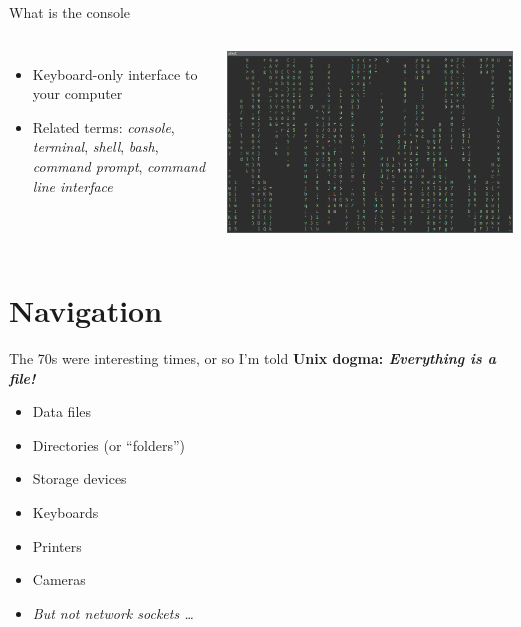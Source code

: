     \begin{frame}[t,fragile]{What is the console}
        \begin{columns}[T]
            \begin{itemize}
                \item Keyboard-only interface to your computer
                \item Related terms: \emph{console}, \emph{terminal},
                    \emph{shell}, \emph{bash}, \emph{command prompt},
                    \emph{command line interface}
            \end{itemize}
            \includegraphics[width=\columnwidth]{img/matrix.png}
        \end{columns}
    \end{frame}

    \section{Navigation}

    \begin{frame}[t,fragile]{The 70s were interesting times, or so I'm told}
        \textbf{Unix dogma: \emph{Everything is a file!}} \\
        \begin{itemize}
            \item Data files
            \item Directories (or ``folders'')
            \item Storage devices
            \item Keyboards
            \item Printers
            \item Cameras
            \item \emph{But not network sockets \ldots}
        \end{itemize}
    \end{frame}

